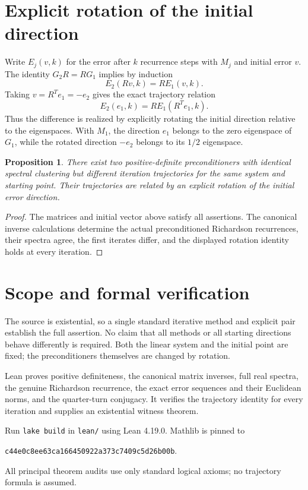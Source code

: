 \documentclass[11pt]{article}
\newtheorem{proposition}{Proposition}
\begin{document}
\section*{Explicit rotation of the initial direction}
Write $E_j(v,k)$ for the error after $k$ recurrence steps with $M_j$ and initial error $v$. The identity $G_2R=RG_1$ implies by induction
\[
 E_2(Rv,k)=R E_1(v,k).
\]
Taking $v=R^Te_1=-e_2$ gives the exact trajectory relation
\[
 E_2(e_1,k)=R E_1(R^Te_1,k).
\]
Thus the difference is realized by explicitly rotating the initial direction relative to the eigenspaces. With $M_1$, the direction $e_1$ belongs to the zero eigenspace of $G_1$, while the rotated direction $-e_2$ belongs to its $1/2$ eigenspace.

\begin{proposition}
There exist two positive-definite preconditioners with identical spectral clustering but different iteration trajectories for the same system and starting point. Their trajectories are related by an explicit rotation of the initial error direction.
\end{proposition}
\begin{proof}
The matrices and initial vector above satisfy all assertions. The canonical inverse calculations determine the actual preconditioned Richardson recurrences, their spectra agree, the first iterates differ, and the displayed rotation identity holds at every iteration.
\end{proof}

\section*{Scope and formal verification}
The source is existential, so a single standard iterative method and explicit pair establish the full assertion. No claim that all methods or all starting directions behave differently is required. Both the linear system and the initial point are fixed; the preconditioners themselves are changed by rotation.

Lean proves positive definiteness, the canonical matrix inverses, full real spectra, the genuine Richardson recurrence, the exact error sequences and their Euclidean norms, and the quarter-turn conjugacy. It verifies the trajectory identity for every iteration and supplies an existential witness theorem.

Run \texttt{lake build} in \texttt{lean/} using Lean 4.19.0. Mathlib is pinned to
\begin{center}\small\texttt{c44e0c8ee63ca166450922a373c7409c5d26b00b}.\end{center}
All principal theorem audits use only standard logical axioms; no trajectory formula is assumed.
\end{document}
